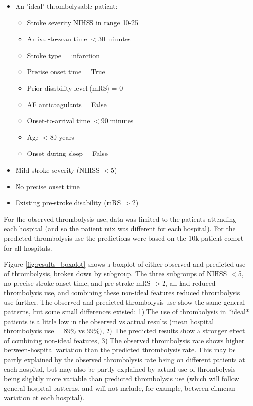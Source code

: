 \begin{itemize}
  \item An 'ideal' thrombolysable patient:
  \begin{itemize}
    \item Stroke severity NIHSS in range 10-25
    \item Arrival-to-scan time $<$30 minutes
    \item Stroke type = infarction
    \item Precise onset time = True
    \item Prior disability level (mRS) = 0
    \item AF anticoagulants = False
    \item Onset-to-arrival time $<$90 minutes
    \item Age $<$80 years
    \item Onset during sleep = False
  \end{itemize}
  \item Mild stroke severity (NIHSS $<$5)
  \item No precise onset time
  \item Existing pre-stroke disability (mRS $>$2)
\end{itemize}

For the observed thrombolysis use, data was limited to the patients attending each hospital (and so the patient mix was different for each hospital). For the predicted thrombolysis use the predictions were based on the 10k patient cohort for all hospitals.

Figure \ref{fig:results_boxplot} shows a boxplot of either observed and predicted use of thrombolysis, broken down by subgroup. The three subgroups of NIHSS $<$5, no precise stroke onset time, and pre-stroke mRS $>2$, all had reduced thrombolysis use, and combining these non-ideal features reduced thrombolysis use further. The observed and predicted thrombolysis use show the same general patterns, but some small differences existed: 1) The use of thrombolysis in *ideal* patients is a little low in the observed vs actual results (mean hospital thrombolysis use = 89\% vs 99\%), 2) The predicted results show a stronger effect of combining non-ideal features, 3) The observed thrombolysis rate shows higher between-hospital variation than the predicted thrombolysis rate. This may be partly explained by the observed thrombolysis rate being on different patients at each hospital, but may also be partly explained by actual use of thrombolysis being slightly more variable than predicted thrombolysis use (which will follow general hospital patterns, and will not include, for example, between-clinician variation at each hospital).

